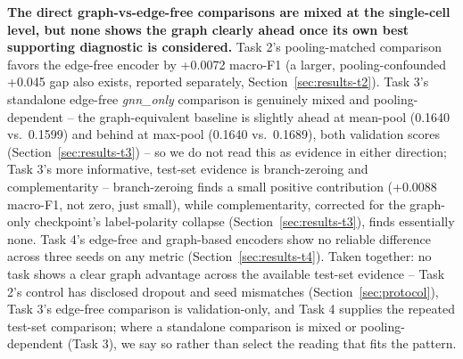 \textbf{The direct graph-vs-edge-free comparisons are mixed at the single-cell level, but
none shows the graph clearly ahead once its own best supporting diagnostic is considered.}
Task 2's pooling-matched comparison favors the edge-free encoder by +0.0072 macro-F1 (a
larger, pooling-confounded +0.045 gap also exists, reported separately,
Section~\ref{sec:results-t2}). Task 3's standalone edge-free \textit{gnn\_only} comparison is
genuinely mixed and pooling-dependent -- the graph-equivalent baseline is slightly ahead at
mean-pool (0.1640 vs.\ 0.1599) and behind at max-pool (0.1640 vs.\ 0.1689), both validation
scores (Section~\ref{sec:results-t3}) -- so we do not read this as evidence in either
direction; Task 3's more informative, test-set evidence is branch-zeroing and
complementarity -- branch-zeroing finds a small positive contribution (+0.0088 macro-F1, not
zero, just small), while complementarity, corrected for the graph-only checkpoint's
label-polarity collapse (Section~\ref{sec:results-t3}), finds essentially none. Task 4's
edge-free and graph-based encoders show no reliable difference across three seeds on any
metric (Section~\ref{sec:results-t4}). Taken together: no task shows a clear graph advantage
across the available test-set evidence -- Task 2's control has disclosed dropout and seed
mismatches (Section~\ref{sec:protocol}), Task 3's edge-free comparison is validation-only,
and Task 4 supplies the repeated test-set comparison; where a standalone comparison is mixed
or pooling-dependent (Task 3), we say so rather than select the reading that fits the
pattern.

